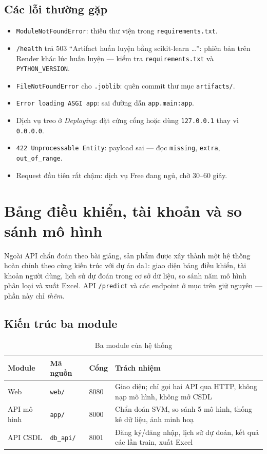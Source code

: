 \documentclass[12pt]{article}
\begin{document}
\subsection{Các lỗi thường gặp}
\begin{itemize}
  \item \texttt{ModuleNotFoundError}: thiếu thư viện trong \texttt{requirements.txt}.
  \item \texttt{/health} trả 503 ``Artifact huấn luyện bằng scikit-learn \dots'': phiên bản trên Render khác lúc
        huấn luyện --- kiểm tra \texttt{requirements.txt} và \texttt{PYTHON\_VERSION}.
  \item \texttt{FileNotFoundError} cho \texttt{.joblib}: quên commit thư mục \texttt{artifacts/}.
  \item \texttt{Error loading ASGI app}: sai đường dẫn \texttt{app.main:app}.
  \item Dịch vụ treo ở \emph{Deploying}: đặt cứng cổng hoặc dùng \texttt{127.0.0.1} thay vì \texttt{0.0.0.0}.
  \item \texttt{422 Unprocessable Entity}: payload sai --- đọc \texttt{missing}, \texttt{extra}, \texttt{out\_of\_range}.
  \item Request đầu tiên rất chậm: dịch vụ Free đang ngủ, chờ 30--60 giây.
\end{itemize}

\section{Bảng điều khiển, tài khoản và so sánh mô hình}
\label{sec:he-thong}

Ngoài API chẩn đoán theo bài giảng, sản phẩm được xây thành một hệ thống hoàn chỉnh theo cùng kiến trúc với dự án
da1: giao diện bảng điều khiển, tài khoản người dùng, lịch sử dự đoán trong cơ sở dữ liệu, so sánh năm mô hình phân
loại và xuất Excel. API \texttt{/predict} và các endpoint ở mục trên giữ nguyên --- phần này chỉ \emph{thêm}.

\subsection{Kiến trúc ba module}

\begin{table}[H]
\centering
\caption{Ba module của hệ thống}
\small
\begin{tabular}{@{}lllp{}@{}}
\toprule
Module & Mã nguồn & Cổng & Trách nhiệm \\
\midrule
Web & \texttt{web/} & 8080 & Giao diện; chỉ gọi hai API qua HTTP, không nạp mô hình, không mở CSDL \\
API mô hình & \texttt{app/} & 8000 & Chẩn đoán SVM, so sánh 5 mô hình, thống kê dữ liệu, ảnh minh hoạ \\
API CSDL & \texttt{db\_api/} & 8001 & Đăng ký/đăng nhập, lịch sử dự đoán, kết quả các lần train, xuất Excel \\
\bottomrule
\end{tabular}
\end{table}
\end{document}

